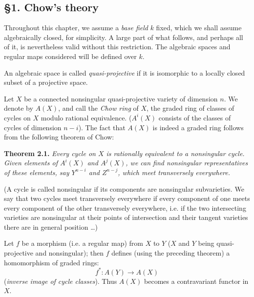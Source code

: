 \subsection*{\S 1. Chow's theory}

Throughout this chapter, we assume a \emph{base field} $k$ fixed, which we shall assume algebraically closed, for simplicity. A large part of what follows, and perhaps all of it, is nevertheless valid without this restriction. The algebraic spaces and regular maps considered will be defined over $k$.

An algebraic space is called \emph{quasi-projective} if it is isomorphic to a locally closed subset of a projective space.

Let $X$ be a connected nonsingular quasi-projective variety of dimension $n$. We denote by $A(X)$, and call the \emph{Chow ring} of $X$, the graded ring of classes of cycles on $X$ modulo rational equivalence. ($A^i(X)$ consists of the classes of cycles of dimension $n-i$). The fact that $A(X)$
%
is indeed a graded ring follows from the following theorem of Chow:

\textbf{Theorem 2.1.} \emph{Every cycle on $X$ is rationally equivalent to a nonsingular cycle. Given elements of $A^i(X)$ and $A^j(X)$, we can find nonsingular representatives of these elements, say $Y^{n-i}$ and $Z^{n-j}$, which meet transversely everywhere.}

(A cycle is called nonsingular if its components are nonsingular subvarieties. We say that two cycles meet transversely everywhere if every component of one meets every component of the other transversely everywhere, i.e. if the two intersecting varieties are nonsingular at their points of intersection and their tangent varieties there are in general position \dots)

Let $f$ be a morphism (i.e. a regular map) from $X$ to $Y$ ($X$ and $Y$ being quasi-projective and nonsingular); then $f$ defines (using the preceding theorem) a homomorphism of graded rings:
\begin{equation}\tag{2.1}
f^*:A(Y)\longrightarrow A(X)
\end{equation}
(\emph{inverse image of cycle classes}). Thus $A(X)$ becomes a contravariant functor in $X$.

